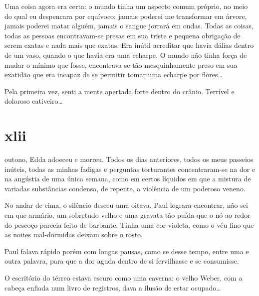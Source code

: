 Uma coisa agora era certa: o mundo tinha um aspecto comum próprio, no meio do
qual eu despencara por equívoco; jamais poderei me transformar em árvore,
jamais poderei matar alguém, jamais o sangue jorrará em ondas. Todas as
coisas, todas as pessoas encontravam-se presas em sua triste e pequena
obrigação de serem exatas e nada mais que exatas. Era inútil acreditar que
havia dálias dentro de um vaso, quando o que havia era uma echarpe. O mundo
não tinha força de mudar o mínimo que fosse, encontrava-se tão mesquinhamente
preso em sua exatidão que era incapaz de se permitir tomar uma echarpe por
flores\ldots{}

Pela primeira vez, senti a mente apertada forte dentro do crânio. Terrível e
doloroso cativeiro\ldots{}


\section{xlii} 

 outono, Edda adoeceu e morreu. Todos os dias anteriores,
 todos os meus passeios inúteis, todas as minhas fadigas e perguntas
 torturantes concentraram-se na dor e na angústia de uma única semana, como
 em certos líquidos em que a mistura de variadas substâncias condensa, de
 repente, a violência de um poderoso veneno.

No andar de cima, o silêncio desceu uma oitava. Paul lograra encontrar, não
sei em que armário, um sobretudo velho e uma gravata tão puída que o nó ao
redor do pescoço parecia feito de barbante. Tinha uma cor violeta, como o véu
fino que as noites mal-dormidas deixam sobre o rosto.


Paul falava rápido porém com longas pausas, como se desse tempo, entre uma e
outra palavra, para que a dor aguda dentro de si fervilhasse e se
consumisse.

O escritório do térreo estava escuro como uma caverna; o velho Weber, com a
cabeça enfiada num livro de registros, dava a ilusão de estar ocupado\ldots
{}

